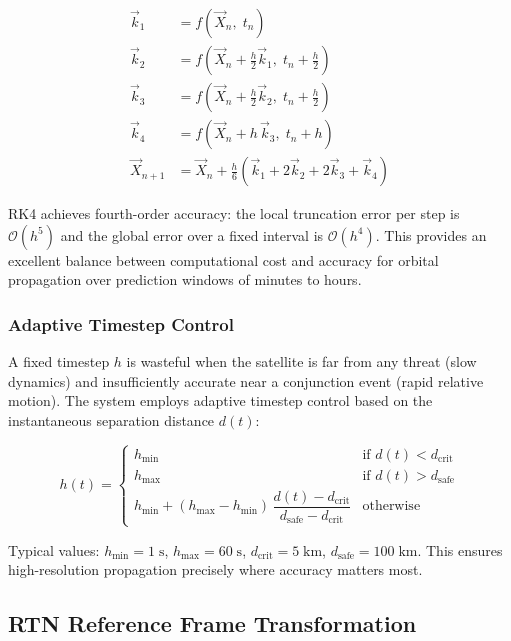 \documentclass[11pt, a4paper]{article}
\begin{document}
\begin{align}
  \vec{k}_1 &= f\!\left(\vec{X}_n,\; t_n\right) \\[4pt]
  \vec{k}_2 &= f\!\left(\vec{X}_n + \tfrac{h}{2}\vec{k}_1,\; t_n + \tfrac{h}{2}\right) \\[4pt]
  \vec{k}_3 &= f\!\left(\vec{X}_n + \tfrac{h}{2}\vec{k}_2,\; t_n + \tfrac{h}{2}\right) \\[4pt]
  \vec{k}_4 &= f\!\left(\vec{X}_n + h\,\vec{k}_3,\; t_n + h\right) \\[6pt]
  \vec{X}_{n+1} &= \vec{X}_n + \frac{h}{6}\!\left(\vec{k}_1 + 2\vec{k}_2 + 2\vec{k}_3 + \vec{k}_4\right)
\end{align}

RK4 achieves fourth-order accuracy: the local truncation error per step is
$\mathcal{O}(h^5)$ and the global error over a fixed interval is $\mathcal{O}(h^4)$.
This provides an excellent balance between computational cost and accuracy for orbital
propagation over prediction windows of minutes to hours.

\subsubsection{Adaptive Timestep Control}

A fixed timestep $h$ is wasteful when the satellite is far from any threat (slow dynamics)
and insufficiently accurate near a conjunction event (rapid relative motion). The system
employs adaptive timestep control based on the instantaneous separation distance $d(t)$:

\[
  h(t) =
  \begin{cases}
    h_{\min} & \text{if } d(t) < d_{\text{crit}} \\[4pt]
    h_{\max} & \text{if } d(t) > d_{\text{safe}} \\[4pt]
    h_{\min} + (h_{\max} - h_{\min})\,\dfrac{d(t) - d_{\text{crit}}}{d_{\text{safe}} - d_{\text{crit}}} & \text{otherwise}
  \end{cases}
\]

Typical values: $h_{\min} = 1\;\text{s}$, $h_{\max} = 60\;\text{s}$,
$d_{\text{crit}} = 5\;\text{km}$, $d_{\text{safe}} = 100\;\text{km}$.
This ensures high-resolution propagation precisely where accuracy matters most.

\subsection{RTN Reference Frame Transformation}
\end{document}
